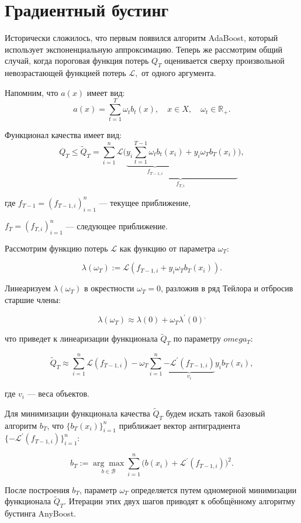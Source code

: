 \documentclass[specialist, 12pt, href]{article}
\begin{document}
\section{Градиентный бустинг}

Исторически сложилось, что первым появился алгоритм AdaBoost, который использует экспоненциальную аппроксимацию. 
Теперь же рассмотрим общий случай, когда пороговая функция потерь $Q_T$ оценивается сверху произвольной невозрастающей функцией потерь $\mathcal{L},$ от одного аргумента.

Напомним, что  $a(x)$ имеет вид:
$$a(x) = \sum\limits_{t=1}^T \omega_t b_t(x), \quad x \in X, \quad \omega_t \in \mathbb{R}_+.$$

Функционал качества имеет вид:
$$Q_T \leq \tilde Q_T= \sum \limits_{i = 1}^n \mathcal{L} \underbrace{\bigg ( \underset{f_{T-1,i}}{\underbrace{y_i\sum\limits_{t=1}^{T-1} \omega_t b_t(x_i)}} + y_i\omega_T b_T(x_i) }_{f_{T, i}}\bigg),$$

где
$f_{T-1} = (f_{T-1,i})_{i=1}^n $ --- текущее приближение, 

$f_T = (f_{T,i})_{i=1}^n $ --- следующее приближение.

Рассмотрим функцию потерь $\mathcal{L}$ как функцию от параметра $\omega_T$:

$$\lambda(\omega_T) := \mathcal{L}(f_{T-1,i} + y_i\omega_T b_T(x_i)).$$

Линеаризуем $\lambda(\omega_T)$ в окрестности $\omega_T = 0$, разложив в ряд Тейлора и отбросив старшие члены:

$$\lambda(\omega_T) \approx \lambda(0) + \omega_T \lambda^ \prime (0)^,$$ 

что приведет к линеаризации функционала $\tilde Q_T$ по параметру $omega_T$:

$$\tilde Q_T \approx \sum \limits_{i = 1}^n \mathcal{L}(f_{T-1,i}) - \omega_T \sum \limits_{i = 1}^n\underset{v_i}{\underbrace{ -\mathcal{L} ^ \prime (f_{T-1,i})}} y_ib_T(x_i),$$

где $v_i$ --- веса объектов.

Для минимизации функционала качества $\tilde Q_T$ будем искать такой базовый алгоритм $b_T$, что $\{b_T(x_i)\}_{i = 1}^n$ приближает вектор антиградиента $\{-\mathcal{L} ^ \prime (f_{T-1,i})\}_{i = 1}^n:$

$$b_T := \underset{b  \in \mathcal{B}}{\arg\max} \sum\limits_{i=1}^n \bigg(b(x_i) + \mathcal{L} ^ \prime (f_{T-1,i})\bigg)^2.$$
 
После построения $b_T$, параметр $\omega_T$ определяется путем одномерной минимизации функционала $\tilde Q_T$.
Итерации этих двух шагов приводят к обобщённому
алгоритму бустинга AnyBoost.
\end{document}
